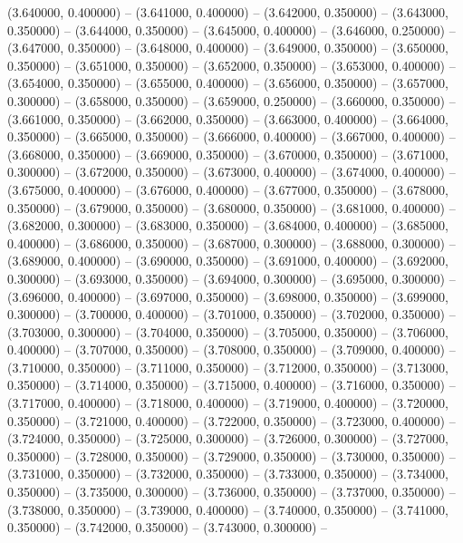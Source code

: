 (3.640000, 0.400000) -- 
(3.641000, 0.400000) -- 
(3.642000, 0.350000) -- 
(3.643000, 0.350000) -- 
(3.644000, 0.350000) -- 
(3.645000, 0.400000) -- 
(3.646000, 0.250000) -- 
(3.647000, 0.350000) -- 
(3.648000, 0.400000) -- 
(3.649000, 0.350000) -- 
(3.650000, 0.350000) -- 
(3.651000, 0.350000) -- 
(3.652000, 0.350000) -- 
(3.653000, 0.400000) -- 
(3.654000, 0.350000) -- 
(3.655000, 0.400000) -- 
(3.656000, 0.350000) -- 
(3.657000, 0.300000) -- 
(3.658000, 0.350000) -- 
(3.659000, 0.250000) -- 
(3.660000, 0.350000) -- 
(3.661000, 0.350000) -- 
(3.662000, 0.350000) -- 
(3.663000, 0.400000) -- 
(3.664000, 0.350000) -- 
(3.665000, 0.350000) -- 
(3.666000, 0.400000) -- 
(3.667000, 0.400000) -- 
(3.668000, 0.350000) -- 
(3.669000, 0.350000) -- 
(3.670000, 0.350000) -- 
(3.671000, 0.300000) -- 
(3.672000, 0.350000) -- 
(3.673000, 0.400000) -- 
(3.674000, 0.400000) -- 
(3.675000, 0.400000) -- 
(3.676000, 0.400000) -- 
(3.677000, 0.350000) -- 
(3.678000, 0.350000) -- 
(3.679000, 0.350000) -- 
(3.680000, 0.350000) -- 
(3.681000, 0.400000) -- 
(3.682000, 0.300000) -- 
(3.683000, 0.350000) -- 
(3.684000, 0.400000) -- 
(3.685000, 0.400000) -- 
(3.686000, 0.350000) -- 
(3.687000, 0.300000) -- 
(3.688000, 0.300000) -- 
(3.689000, 0.400000) -- 
(3.690000, 0.350000) -- 
(3.691000, 0.400000) -- 
(3.692000, 0.300000) -- 
(3.693000, 0.350000) -- 
(3.694000, 0.300000) -- 
(3.695000, 0.300000) -- 
(3.696000, 0.400000) -- 
(3.697000, 0.350000) -- 
(3.698000, 0.350000) -- 
(3.699000, 0.300000) -- 
(3.700000, 0.400000) -- 
(3.701000, 0.350000) -- 
(3.702000, 0.350000) -- 
(3.703000, 0.300000) -- 
(3.704000, 0.350000) -- 
(3.705000, 0.350000) -- 
(3.706000, 0.400000) -- 
(3.707000, 0.350000) -- 
(3.708000, 0.350000) -- 
(3.709000, 0.400000) -- 
(3.710000, 0.350000) -- 
(3.711000, 0.350000) -- 
(3.712000, 0.350000) -- 
(3.713000, 0.350000) -- 
(3.714000, 0.350000) -- 
(3.715000, 0.400000) -- 
(3.716000, 0.350000) -- 
(3.717000, 0.400000) -- 
(3.718000, 0.400000) -- 
(3.719000, 0.400000) -- 
(3.720000, 0.350000) -- 
(3.721000, 0.400000) -- 
(3.722000, 0.350000) -- 
(3.723000, 0.400000) -- 
(3.724000, 0.350000) -- 
(3.725000, 0.300000) -- 
(3.726000, 0.300000) -- 
(3.727000, 0.350000) -- 
(3.728000, 0.350000) -- 
(3.729000, 0.350000) -- 
(3.730000, 0.350000) -- 
(3.731000, 0.350000) -- 
(3.732000, 0.350000) -- 
(3.733000, 0.350000) -- 
(3.734000, 0.350000) -- 
(3.735000, 0.300000) -- 
(3.736000, 0.350000) -- 
(3.737000, 0.350000) -- 
(3.738000, 0.350000) -- 
(3.739000, 0.400000) -- 
(3.740000, 0.350000) -- 
(3.741000, 0.350000) -- 
(3.742000, 0.350000) -- 
(3.743000, 0.300000) -- 
